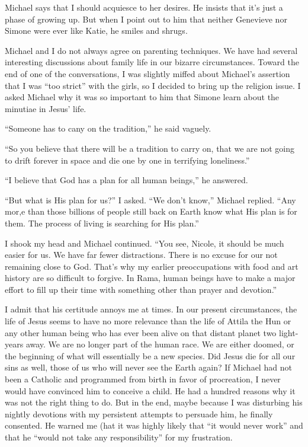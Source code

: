 \documentclass[]{article}
\begin{document}
Michael says that I should acquiesce to her desires.  He insists that it’s just a phase of growing up.  But when I point out to him that neither Genevieve nor Simone were ever like Katie, he smiles and shrugs.

Michael and I do not always agree on parenting techniques.  We have had several interesting discussions about family life in our bizarre circumstances.  Toward the end of one of the conversations, I was slightly miffed about Michael’s assertion that I was “too strict” with the girls, so I decided to bring up the religion issue.  I asked Michael why it was so important to him that Simone learn about the minutiae in Jesus’ life.

“Someone has to cany on the tradition,” he said vaguely.

“So you believe that there will be a tradition to carry on, that we are not going to drift forever in space and die one by one in terrifying loneliness.”

“I believe that God has a plan for all human beings,” he answered.

“But what is His plan for us?” I asked.  “We don’t know,” Michael replied.  “Any mor,e than those billions of people still back on Earth know what His plan is for them.  The process of living is searching for His plan.”

I shook my head and Michael continued.  “You see, Nicole, it should be much easier for us.  We have far fewer distractions.  There is no excuse for our not remaining close to God.  That’s why my earlier preoccupations with food and art history are so difficult to forgive.  In Rama, human beings have to make a major effort to fill up their time with something other than prayer and devotion.”

I admit that his certitude annoys me at times.  In our present circumstances, the life of Jesus seems to have no more relevance than the life of Attila the Hun or any other human being who has ever been alive on that distant planet two light-years away.  We are no longer part of the human race.  We are either doomed, or the beginning of what will essentially be a new species.  Did Jesus die for all our sins as well, those of us who will never see the Earth again? If Michael had not been a Catholic and programmed from birth in favor of procreation, I never would have convinced him to conceive a child.  He had a hundred reasons why it was not the right thing to do.  But in the end, maybe because I was disturbing his nightly devotions with my persistent attempts to persuade him, he finally consented.  He warned me (hat it was highly likely that “it would never work” and that he “would not take any responsibility” for my frustration.
\end{document}
